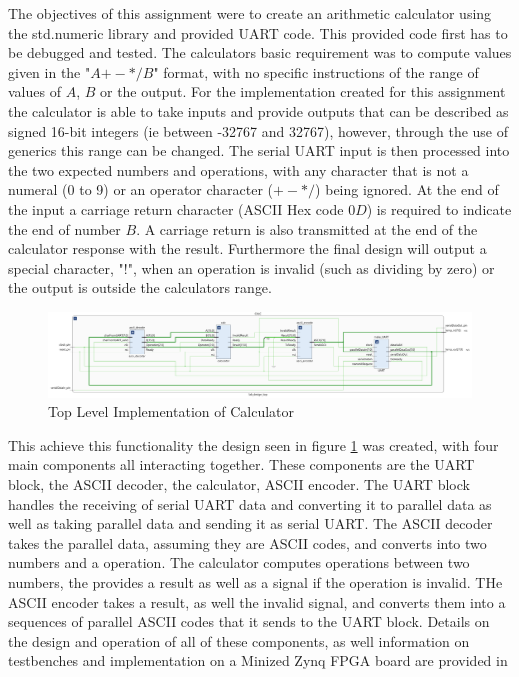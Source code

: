 \documentclass[11pt]{article}
\begin{document}
The objectives of this assignment were to create an arithmetic calculator using the std.numeric library and provided UART code.
This provided code first has to be debugged and tested.
The calculators basic requirement was to compute values given in the "$A {+-*/} B$" format, with no specific instructions of the range of values of $A$, $B$ or the output.
For the implementation created for this assignment the calculator is able to take inputs and provide outputs that can be described as signed 16-bit integers (ie between -32767 and 32767),
however, through the use of generics this range can be changed.
The serial UART input is then processed into the two expected numbers and operations, with any character that is not a numeral (0 to 9) or an operator character ($+-*/$) being ignored.
At the end of the input a carriage return character (ASCII Hex code $0D$) is required to indicate the end of number $B$.
A carriage return is also transmitted at the end of the calculator response with the result.
Furthermore the final design will output a special character, "!", when an operation is invalid (such as dividing by zero) or the output is outside the calculators range.

\begin{figure}[H]        
    \centering
    \includegraphics[width=\textwidth]{TopLevelImp.png}
    \caption{Top Level Implementation of Calculator}
    \label{fig:toplevel}
\end{figure} 

This achieve this functionality the design seen in figure \ref{fig:toplevel} was created, with four main components all interacting together.
These components are the UART block, the ASCII decoder, the calculator, ASCII encoder.
The UART block handles the receiving of serial UART data and converting it to parallel data as well as taking parallel data and sending it as serial UART.
The ASCII decoder takes the parallel data, assuming they are ASCII codes, and converts into two numbers and a operation.
The calculator computes operations between two numbers, the provides a result as well as a signal if the operation is invalid.
THe ASCII encoder takes a result, as well the invalid signal, and converts them into a sequences of parallel ASCII codes that it sends to the UART block.
Details on the design and operation of all of these components, as well information on testbenches and implementation on a Minized Zynq FPGA board are provided in
\end{document}
